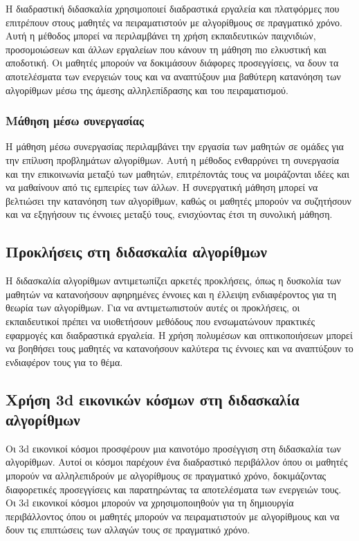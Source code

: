 Η διαδραστική διδασκαλία χρησιμοποιεί διαδραστικά εργαλεία και πλατφόρμες που επιτρέπουν στους μαθητές να πειραματιστούν με αλγορίθμους σε πραγματικό χρόνο. Αυτή η μέθοδος μπορεί να περιλαμβάνει τη χρήση εκπαιδευτικών παιχνιδιών, προσομοιώσεων και άλλων εργαλείων που κάνουν τη μάθηση πιο ελκυστική και αποδοτική. Οι μαθητές μπορούν να δοκιμάσουν διάφορες προσεγγίσεις, να δουν τα αποτελέσματα των ενεργειών τους και να αναπτύξουν μια βαθύτερη κατανόηση των αλγορίθμων μέσω της άμεσης αλληλεπίδρασης και του πειραματισμού\cite{__2022}.

\subsubsection{Μάθηση μέσω συνεργασίας}

Η μάθηση μέσω συνεργασίας περιλαμβάνει την εργασία των μαθητών σε ομάδες για την επίλυση προβλημάτων αλγορίθμων. Αυτή η μέθοδος ενθαρρύνει τη συνεργασία και την επικοινωνία μεταξύ των μαθητών, επιτρέποντάς τους να μοιράζονται ιδέες και να μαθαίνουν από τις εμπειρίες των άλλων. Η συνεργατική μάθηση μπορεί να βελτιώσει την κατανόηση των αλγορίθμων, καθώς οι μαθητές μπορούν να συζητήσουν και να εξηγήσουν τις έννοιες μεταξύ τους, ενισχύοντας έτσι τη συνολική μάθηση\cite{crepinsek_note_2012}.


\subsection{Προκλήσεις στη διδασκαλία αλγορίθμων}

Η διδασκαλία αλγορίθμων αντιμετωπίζει αρκετές προκλήσεις, όπως η δυσκολία των μαθητών να κατανοήσουν αφηρημένες έννοιες και η έλλειψη ενδιαφέροντος για τη θεωρία των αλγορίθμων. Για να αντιμετωπιστούν αυτές οι προκλήσεις, οι εκπαιδευτικοί πρέπει να υιοθετήσουν μεθόδους που ενσωματώνουν πρακτικές εφαρμογές και διαδραστικά εργαλεία. Η χρήση πολυμέσων και οπτικοποιήσεων μπορεί να βοηθήσει τους μαθητές να κατανοήσουν καλύτερα τις έννοιες και να αναπτύξουν το ενδιαφέρον τους για το θέμα\cite{__2017}.


\subsection{Χρήση \acrshort{3d} εικονικών κόσμων στη διδασκαλία αλγορίθμων}

Οι \acrshort{3d} εικονικοί κόσμοι προσφέρουν μια καινοτόμο προσέγγιση στη διδασκαλία των αλγορίθμων. Αυτοί οι κόσμοι παρέχουν ένα διαδραστικό περιβάλλον όπου οι μαθητές μπορούν να αλληλεπιδρούν με αλγορίθμους σε πραγματικό χρόνο, δοκιμάζοντας διαφορετικές προσεγγίσεις και παρατηρώντας τα αποτελέσματα των ενεργειών τους. Οι \acrshort{3d} εικονικοί κόσμοι μπορούν να χρησιμοποιηθούν για τη δημιουργία περιβάλλοντος όπου οι μαθητές μπορούν να πειραματιστούν με αλγορίθμους και να δουν τις επιπτώσεις των αλλαγών τους σε πραγματικό χρόνο\cite{crepinsek_note_2012}.

